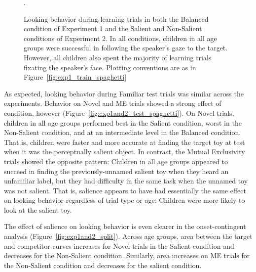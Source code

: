 \documentclass[man,floatsintext]{apa6}
\begin{document}
\begin{figure}[tb]
	\caption{\label{fig:exp1and2_train_spaghetti} Looking behavior during learning trials in both the Balanced condition of Experiment 1 and the Salient and Non-Salient conditions of Experiment 2. In all conditions, children in all age groups were successful in following the speaker's gaze to the target. However, all children also spent the majority of learning trials fixating the speaker's face. Plotting conventions are as in Figure~\ref{fig:exp1_train_spaghetti}}.
\end{figure}

As expected, looking behavior during Familiar test trials was similar across the experiments. Behavior on Novel and ME trials showed a strong effect of condition, however (Figure~\ref{fig:exp1and2_test_spaghetti}). On Novel trials, children in all age groups performed best in the Salient condition, worst in the Non-Salient condition, and at an intermediate level in the Balanced condition. That is, children were faster and more accurate at finding the target toy at test when it was the perceptually salient object. In contrast, the Mutual Exclusivity trials showed the opposite pattern: Children in all age groups appeared to succeed in finding the previously-unnamed salient toy when they heard an unfamiliar label, but they had difficulty in the same task when the unnamed toy was not salient. That is, salience appears to have had essentially the same effect on looking behavior regardless of trial type or age: Children were more likely to look at the salient toy.

The effect of salience on looking behavior is even clearer in the onset-contingent analysis (Figure~\ref{fig:exp1and2_split}). Across age groups, area between the target and competitor curves increases for Novel trials in the Salient condition and decreases for the Non-Salient condition. Similarly, area increases on ME trials for the Non-Salient condition and decreases for the salient condition. 
\end{document}
